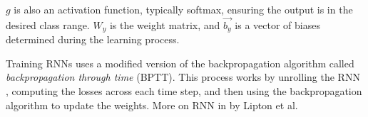 $g$ is also an activation function, typically softmax, ensuring the output is in the desired class range. $W_y$ is the weight matrix, and $\vec{b_y}$ is a vector of biases determined during the learning process.

Training RNNs uses a modified version of the backpropagation algorithm called \textit{backpropagation through time} (BPTT). This process works by unrolling the RNN \cite{Goodfellow-et-al-2016}, computing the losses across each time step, and then using the backpropagation algorithm to update the weights. More on RNN in \cite{lipton2015critical} by Lipton et al.

